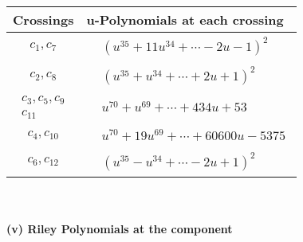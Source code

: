 \documentclass[1p]{elsarticle_modified}
\theoremstyle{definition}
\begin{document}
\begin{tabular}{m{50pt}|m{274pt}}
Crossings & \hspace{64pt}u-Polynomials at each crossing \\
\hline $$\begin{aligned}c_{1},c_{7}\end{aligned}$$&$\begin{aligned}
&(u^{35}+11 u^{34}+\cdots-2 u-1)^{2}
\end{aligned}$\\
\hline $$\begin{aligned}c_{2},c_{8}\end{aligned}$$&$\begin{aligned}
&(u^{35}+u^{34}+\cdots+2 u+1)^{2}
\end{aligned}$\\
\hline $$\begin{aligned}c_{3},c_{5},c_{9}\\c_{11}\end{aligned}$$&$\begin{aligned}
&u^{70}+u^{69}+\cdots+434 u+53
\end{aligned}$\\
\hline $$\begin{aligned}c_{4},c_{10}\end{aligned}$$&$\begin{aligned}
&u^{70}+19 u^{69}+\cdots+60600 u-5375
\end{aligned}$\\
\hline $$\begin{aligned}c_{6},c_{12}\end{aligned}$$&$\begin{aligned}
&(u^{35}- u^{34}+\cdots-2 u+1)^{2}
\end{aligned}$\\
\hline
\end{tabular}\\~\\
\newpage\renewcommand{\arraystretch}{1}
\flushleft \textbf{(v) Riley Polynomials at the component}\newline \\
\end{document}
